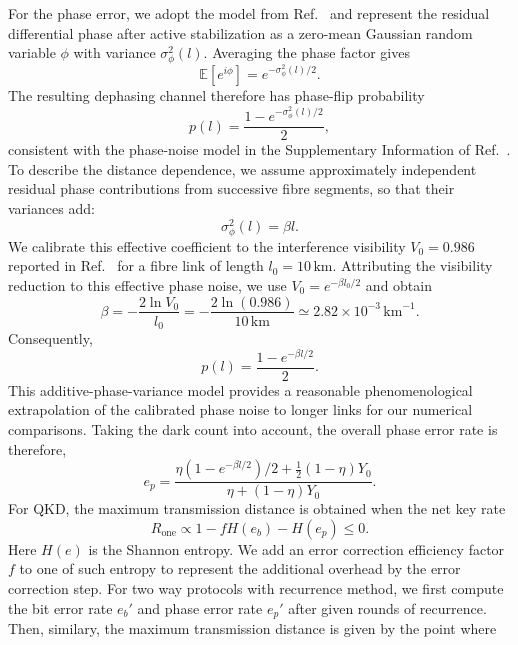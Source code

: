 \documentclass[onecolumn,prx,longbibliography,nofootinbib, superscriptaddress]{revtex4-2}
\theoremstyle{recap}
\begin{document}
For the phase error, we adopt the model from Ref.~\cite{Liu2026} and represent the residual differential phase after active stabilization as a zero-mean Gaussian random variable $\phi$ with variance $\sigma_\phi^2(l)$. Averaging the phase factor gives
\begin{equation}
    \mathbb{E}[e^{i\phi}]=e^{-\sigma_\phi^2(l)/2}.
\end{equation}
The resulting dephasing channel therefore has phase-flip probability
\begin{equation}
    p(l)=\frac{1-e^{-\sigma_\phi^2(l)/2}}{2},
\end{equation}
consistent with the phase-noise model in the Supplementary Information of Ref.~\cite{Liu2026}. To describe the distance dependence, we assume approximately independent residual phase contributions from successive fibre segments, so that their variances add:
\begin{equation}
    \sigma_\phi^2(l)=\beta l.
\end{equation}
We calibrate this effective coefficient to the interference visibility $V_0=0.986$ reported in Ref.~\cite{Liu2026} for a fibre link of length $l_0=10\,\mathrm{km}$. Attributing the visibility reduction to this effective phase noise, we use $V_0=e^{-\beta l_0/2}$ and obtain
\begin{equation}
    \beta=-\frac{2\ln V_0}{l_0}=-\frac{2\ln(0.986)}{10\,\mathrm{km}}\simeq2.82\times10^{-3}\,\mathrm{km}^{-1}.
\end{equation}
Consequently,
\begin{equation}
    p(l)=\frac{1-e^{-\beta l/2}}{2}.
\end{equation}
This additive-phase-variance model provides a reasonable phenomenological extrapolation of the calibrated phase noise to longer links for our numerical comparisons. Taking the dark count into account, the overall phase error rate is therefore,
\begin{equation}
    e_p=\frac{\eta(1-e^{-\beta l/2})/2+\frac{1}{2}(1-\eta)Y_0}{\eta+(1-\eta)Y_0}.
\end{equation}
For QKD, the maximum transmission distance is obtained when the net key rate
\begin{equation}
    R_{\textrm{one}}\propto 1-fH(e_b)-H(e_p)\leq 0.
\end{equation}
Here $H(e)$ is the Shannon entropy. We add an error correction efficiency factor $f$ to one of such entropy to represent the additional overhead by the error correction step. For two way protocols with recurrence method, we first compute the bit error rate $e_b'$ and phase error rate $e_p'$ after given rounds of recurrence. Then, similary, the maximum transmission distance is given by the point where 
\end{document}

